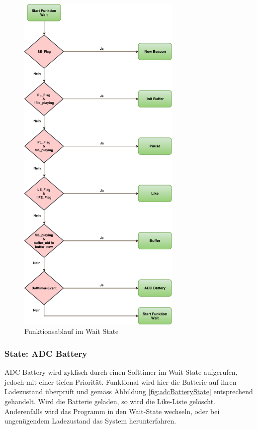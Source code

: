 \begin{figure}[htbp!!!!]
	\centering
	\includegraphics[width=0.7\textwidth]{Data/Wait_picture.pdf}
	\caption[Statemachine: Wait]{Funktionsablauf im Wait State}
	\label{fig:waitState}
\end{figure} 

\subsubsection*{State: ADC Battery}
ADC-Battery wird zyklisch durch einen Softtimer im Wait-State aufgerufen, jedoch mit einer tiefen Priorität. Funktional wird hier die Batterie auf ihren Ladezustand überprüft und gemäss Abbildung \ref{fig:adcBatteryState} entsprechend gehandelt. Wird die Batterie geladen, so wird die Like-Liste gelöscht. Anderenfalls wird das Programm in den Wait-State wechseln, oder bei ungenügendem Ladezustand das System herunterfahren.

